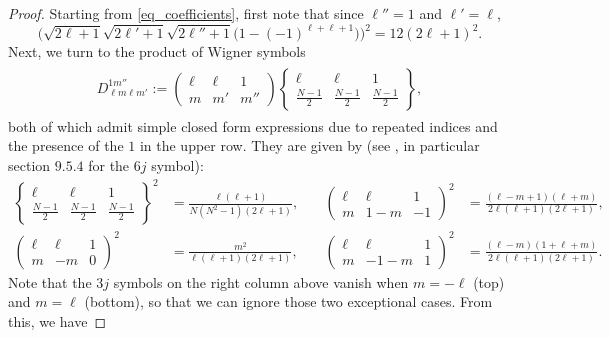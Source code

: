 \documentclass[11pt]{amsart}
\numberwithin{equation}{section}
\theoremstyle{definition}
\begin{document}
\begin{proof}
Starting from \eqref{eq_coefficients}, first note that since $\ell''=1$ and $\ell'=\ell$, 
\begin{equation}
\Big(\sqrt{2\ell+1}\sqrt{2\ell'+1}\sqrt{2\ell''+1}\big(1-(-1)^{\ell+\ell+1}\big)\Big)^2 = 12(2\ell+1)^2.
\end{equation}
Next, we turn to the product of Wigner symbols
\begin{gather*}
\begin{split}
D_{\ell m\ell m'}^{1 m''} := 
\left(\begin{matrix}
\ell & \ell & 1 \\
m & m' & m''
\end{matrix}
\right)
\left\{\begin{matrix}
\ell & \ell & 1 \\
\frac{N-1}{2} & \frac{N-1}{2} & \frac{N-1}{2}
\end{matrix}
\right\},
\end{split}
\end{gather*}
both of which admit simple closed form expressions due to repeated indices and the presence of the $1$ in the upper row. They are given by (see \cite{Varshalovich1988quantum}, in particular section $9.5.4$ for the $6j$ symbol):
\begin{align*}
\left\{\begin{matrix}
\ell & \ell & 1 \\
\frac{N-1}{2} & \frac{N-1}{2} & \frac{N-1}{2}
\end{matrix}\right\}^2
&=
\frac{\ell(\ell+1)}{N(N^2-1)(2\ell+1)},
\quad 
&\left(\begin{matrix}
\ell & \ell & 1 \\
m & 1-m & -1
\end{matrix}\right)^2
&=
\frac{(\ell-m+1)(\ell+m)}{2\ell(\ell+1)(2\ell+1)}, \\
\left(\begin{matrix}
\ell & \ell & 1 \\
m & -m & 0
\end{matrix}\right)^2
&=
\frac{m^2}{\ell(\ell+1)(2\ell+1)},
\quad
&\left(\begin{matrix}
\ell & \ell & 1 \\
m & -1-m & 1
\end{matrix}\right)^2 &= \frac{(\ell-m)(1+\ell+m)}{2\ell(\ell+1)(2\ell+1)}.
\end{align*}
Note that the $3j$ symbols on the right column above vanish when $m = -\ell$ (top) and $m = \ell$ (bottom), so that we can ignore those two exceptional cases. From this, we have

\end{proof}
\end{document}
